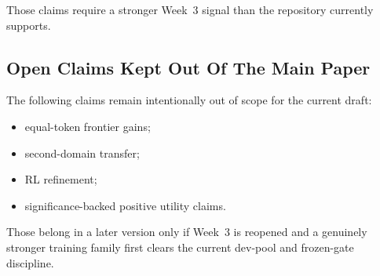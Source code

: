 Those claims require a stronger Week~3 signal than the repository currently supports.

\subsection{Open Claims Kept Out Of The Main Paper}

The following claims remain intentionally out of scope for the current draft:

\begin{itemize}
  \item equal-token frontier gains;
  \item second-domain transfer;
  \item RL refinement;
  \item significance-backed positive utility claims.
\end{itemize}

Those belong in a later version only if Week~3 is reopened and a genuinely stronger training family first clears the current dev-pool and frozen-gate discipline.
